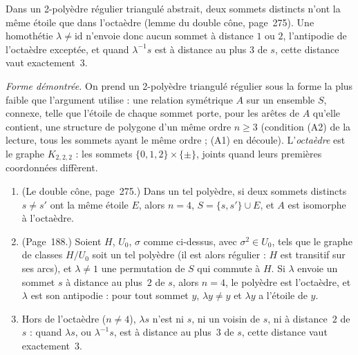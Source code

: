 \begin{encadre}
\begin{theoreme}
Dans un 2-polyèdre régulier triangulé abstrait, deux sommets distincts n'ont la même étoile que dans l'octaèdre (lemme du double cône, page~275). Une homothétie $\lambda \neq \mathrm{id}$ n'envoie donc aucun sommet à distance $1$ ou $2$, l'antipodie de l'octaèdre exceptée, et quand $\lambda^{-1}s$ est à distance au plus $3$ de $s$, cette distance vaut exactement~$3$.
\end{theoreme}
\end{encadre}

\noindent\emph{Forme démontrée.} On prend un 2-polyèdre triangulé régulier sous la forme la plus faible que l'argument utilise : une relation symétrique $A$ sur un ensemble $S$, connexe, telle que l'étoile de chaque sommet porte, pour les arêtes de $A$ qu'elle contient, une structure de polygone d'un même ordre $n \geq 3$ (condition (A2) de la lecture, tous les sommets ayant le même ordre ; (A1) en découle). L'\emph{octaèdre} est le graphe $K_{2,2,2}$ : les sommets $\{0, 1, 2\} \times \{\pm\}$, joints quand leurs premières coordonnées diffèrent.

\begin{encadre}
\begin{theoreme}\leavevmode
\begin{enumerate}
\item (Le double cône, page~275.) Dans un tel polyèdre, si deux sommets distincts $s \neq s'$ ont la même étoile $E$, alors $n = 4$, $S = \{s, s'\} \cup E$, et $A$ est isomorphe à l'octaèdre.
\item (Page~188.) Soient $H$, $U_0$, $\sigma$ comme ci-dessus, avec $\sigma^2 \in U_0$, tels que le graphe de classes $H/U_0$ soit un tel polyèdre (il est alors régulier : $H$ est transitif sur ses arcs), et $\lambda \neq 1$ une permutation de $S$ qui commute à $H$. Si $\lambda$ envoie un sommet $s$ à distance au plus~$2$ de $s$, alors $n = 4$, le polyèdre est l'octaèdre, et $\lambda$ est son antipodie : pour tout sommet $y$, $\lambda y \neq y$ et $\lambda y$ a l'étoile de $y$.
\item Hors de l'octaèdre ($n \neq 4$), $\lambda s$ n'est ni $s$, ni un voisin de $s$, ni à distance~$2$ de $s$ : quand $\lambda s$, ou $\lambda^{-1}s$, est à distance au plus~$3$ de $s$, cette distance vaut exactement~$3$.
\end{enumerate}
\end{theoreme}
\end{encadre}

